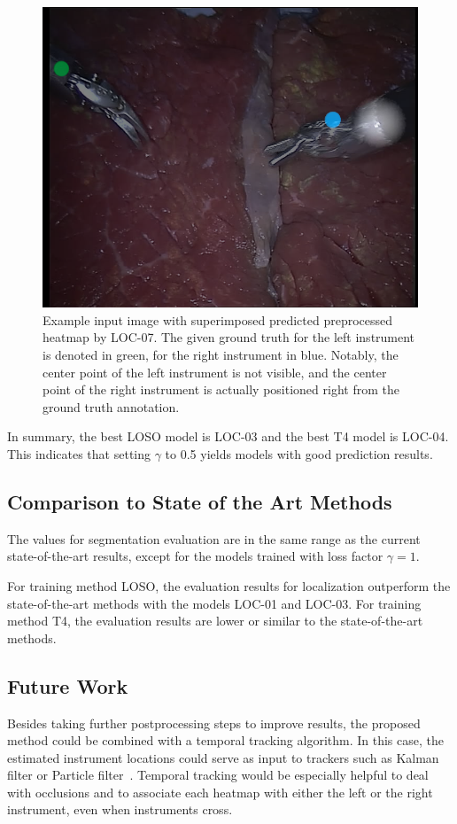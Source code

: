 \begin{figure}
\centering
\includegraphics[width=.5\textwidth]{images/predictions/model7/frame001_superimposed_perd_and_gt.png}
\caption[Example image ground truth annotation]{Example input image with superimposed predicted preprocessed heatmap by LOC-07. The given ground truth for the left instrument is denoted in green, for the right instrument in blue. Notably, the center point of the left instrument is not visible, and the center point of the right instrument is actually positioned right from the ground truth annotation.}
\label{img:wrong_test_gt_exampe+pred}
\end{figure}

In summary, the best LOSO model is LOC-03 and the best T4 model is LOC-04. This indicates that setting $\gamma$ to 0.5 yields models with good prediction results.

\subsection{Comparison to State of the Art Methods} 
The values for segmentation evaluation are in the same range as the current state-of-the-art results, except for the models trained with loss factor $\gamma=1$.

For training method LOSO, the evaluation results for localization outperform the state-of-the-art methods with the models LOC-01 and LOC-03. 
For training method T4, the evaluation results are lower or similar to the state-of-the-art methods.

\subsection{Future Work}
Besides taking further postprocessing steps to improve results, the proposed method could be combined with a temporal tracking algorithm. In this case, the estimated instrument locations could serve as input to trackers such as Kalman filter or Particle filter~\cite{kalman_filter1992brown}. Temporal tracking would be especially helpful to deal with occlusions and to associate each heatmap with either the left or the right instrument, even when instruments cross.
